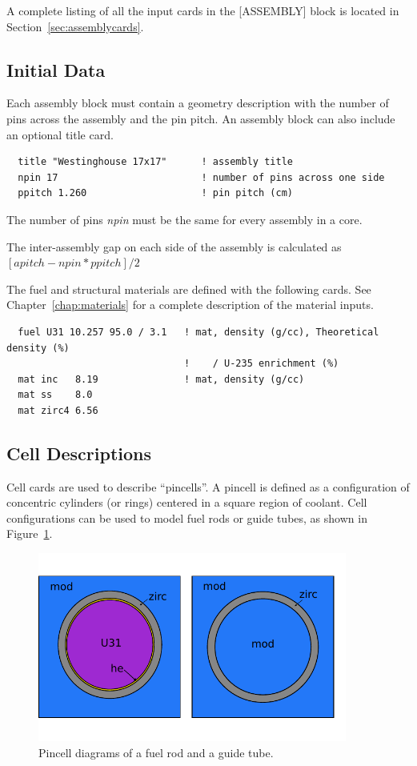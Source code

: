 A complete listing of all the input cards in the [ASSEMBLY] block is located in Section~\ref{sec:assemblycards}.

\subsection{Initial Data}

Each assembly block must contain a geometry description with the number of pins across the assembly and
the pin pitch.  An assembly block can also include an optional title card.
\begin{verbatim}
  title "Westinghouse 17x17"      ! assembly title
  npin 17                         ! number of pins across one side
  ppitch 1.260                    ! pin pitch (cm)
\end{verbatim}

The number of pins {\it npin} must be the same for every assembly in a core.

The inter-assembly gap on each side of the assembly is calculated as $[apitch-npin*ppitch]/2$

The fuel and structural materials are defined with the following cards.
See Chapter~\ref{chap:materials} for a complete description of the material inputs.
\begin{verbatim}
  fuel U31 10.257 95.0 / 3.1   ! mat, density (g/cc), Theoretical density (%)
                               !    / U-235 enrichment (%)
  mat inc   8.19               ! mat, density (g/cc)
  mat ss    8.0
  mat zirc4 6.56
\end{verbatim}

\subsection{Cell Descriptions}

Cell cards are used to describe ``pincells''.  A pincell is defined as a configuration
of concentric cylinders (or rings) centered in a square region of coolant.
Cell configurations can be used to model fuel rods or guide tubes,
as shown in Figure~\ref{fig:pincell}.
\begin{figure}
\begin{center}
\includegraphics[width=4in]{figs/pincell1.pdf}
\end{center}
\caption{\label{fig:pincell} Pincell diagrams of a fuel rod and a guide tube.}
\end{figure}

